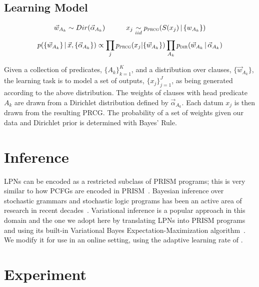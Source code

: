 \documentclass{article} %
\begin{document}
\subsection{Learning Model}


\[ \vec{w}_{A_k} \sim Dir(\vec{\alpha}_{A_k})\hspace{3em}
   x_j \underset{iid}{\sim} p_{\text{\textsc{prcg}}}(S(x_j)\,|\,\{w_{A_k}\}) \]
\[  p(\{\vec{w}_{A_k}\}\,|\, \vec{x}, \{\vec{\alpha}_{A_k}\}) \propto
  \prod_j p_{\text{\textsc{prcg}}}(x_j|\{\vec{w}_{A_k}\}) \prod_{A_k}
  p_{\text{\textsc{dir}}}(\vec{w}_{A_k}\,|\,\vec{\alpha}_{A_k}) \]

  \vspace{-1em}
Given a collection of predicates, $\{A_k\}_{k=1}^{K}$, and a
distribution over clauses, $\{\vec{w}_{A_k}\}$, the learning task is
to model a set of outputs, $\{x_j\}_{j=1}^{J}$, as being generated
according to the above distribution. The weights of clauses
with head predicate $A_k$ are drawn from a Dirichlet distribution
defined by $\vec{\alpha}_{A_k}$. Each datum $x_j$ is then drawn
from the resulting PRCG. The probability of a set of weights given our data and Dirichlet prior is determined with Bayes' Rule.

\section{Inference \label{sec:implementation}}

LPNs can be encoded as a restricted subclass of PRISM programs; this
is very similar to how PCFGs are encoded in
PRISM~\cite{DBLP:conf/cl/2000}. Bayesian inference over stochastic
grammars and stochastic logic programs has been an active area of
research in recent decades~\cite{DBLP:journals/etai/Muggleton00,
  cussens2001parameter, DBLP:conf/emnlp/LiangPJK07,
  goldwater2006contextual, johnson2006adaptor}.  Variational inference
is a popular approach in this domain and the one we adopt here by
translating LPNs into PRISM programs and using its built-in
Variational Bayes Expectation-Maximization
algorithm~\cite{sato2008variational}. We modify it for use in an
online setting, using the adaptive learning rate of
\cite{ranganath2013adaptive}.

\section{Experiment}
\end{document}
